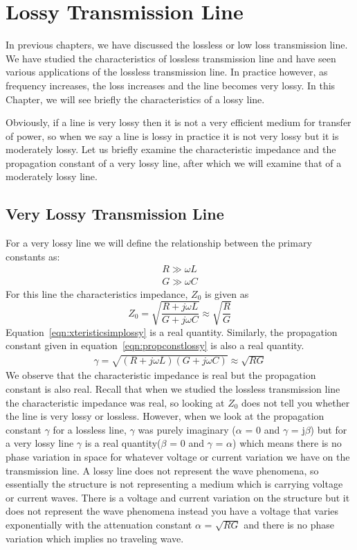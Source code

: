 \chapter{Lossy Transmission Line}\label{lec:lec13}
In previous chapters, we have discussed the lossless or low loss transmission line. We have studied the characteristics of lossless transmission line and have seen various applications of the lossless transmission line. In practice however, as frequency increases, the loss increases and the line becomes very lossy. In this Chapter, we will see briefly the characteristics of a lossy line.

Obviously, if a line is very lossy then it is not a very efficient medium for transfer of power, so when we say a line is lossy in practice it is not very lossy but it is moderately lossy. Let us briefly examine the characteristic impedance and the propagation constant of a very lossy line, after which we will examine that of a moderately lossy line.

\section{Very Lossy Transmission Line}
For a very lossy line we will define the relationship between the primary constants as:
\begin{align*}
R\gg\omega L
\\G\gg\omega C
\end{align*}
For this line the characteristics impedance, $Z_0$ is given as
\begin{dmath}
Z_0 = \sqrt{\frac{R + j\omega L}{G + j\omega C}} \approx  \sqrt{\frac{R}{G}}
\label{eqn:xteristicsimplossy}
\end{dmath}
Equation~\eqref{eqn:xteristicsimplossy} is a real quantity. Similarly, the propagation constant given in equation~\eqref{eqn:propconstlossy} is also a real quantity.
\begin{align}
\gamma = \sqrt{(R + j\omega L)(G + j\omega C)} \approx \sqrt{RG}
\label{eqn:propconstlossy}
\end{align}
We observe that the characteristic impedance is real but the propagation constant is also real. Recall that when we studied the lossless transmission line the characteristic impedance was real, so looking at $Z_0$ does not tell you whether the line is very lossy or lossless. However, when we look at the propagation constant  $\gamma$ for a lossless line, $\gamma$ was purely imaginary ($\alpha$ = 0 and $\gamma$ = j$\beta$) but for  a very lossy line $\gamma$ is a real quantity($\beta$ = 0 and $\gamma$ = $\alpha$) which means there is no phase variation in space for whatever voltage or current variation we have on the transmission line. A lossy line does not represent the wave phenomena, so essentially the structure is not representing a medium which is carrying voltage or current waves. There is a voltage and current variation on the structure but it does not represent the wave phenomena instead you have a voltage that varies exponentially with the attenuation constant $\alpha$ = $\sqrt{RG}$ and there is no phase variation which implies no traveling wave.


